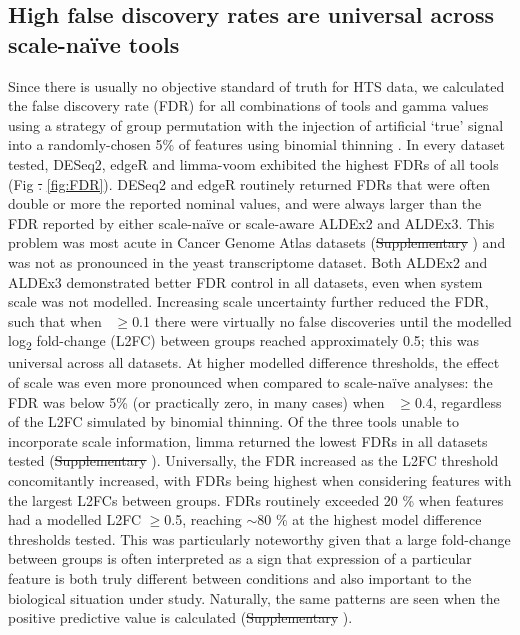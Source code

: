 \documentclass[10pt,letterpaper]{article}
\providecommand{\DIFdeltex}[1]{{\protect\color{red}\sout{#1}}}                      %
\providecommand{\DIFdelbegin}{} %
\providecommand{\DIFdelend}{} %
\providecommand{\DIFdel}[1]{\texorpdfstring{\DIFdeltex{#1}}{}} %
\newcommand{\DIFscaledelfig}{0.5}
\newlength{\DIFdelgraphicswidth} %
\newlength{\DIFdelgraphicsheight} %
\newcommand{\DIFdelincludegraphics}[2][]{%
\sbox{\DIFdelgraphicsbox}{\DIFOincludegraphics[#1]{#2}}%
\settoboxwidth{\DIFdelgraphicswidth}{\DIFdelgraphicsbox} %
\settoboxtotalheight{\DIFdelgraphicsheight}{\DIFdelgraphicsbox} %
\scalebox{\DIFscaledelfig}{%
\parbox[b]{\DIFdelgraphicswidth}{\usebox{\DIFdelgraphicsbox}\\[-\baselineskip] \rule{\DIFdelgraphicswidth}{0em}}\llap{\resizebox{\DIFdelgraphicswidth}{\DIFdelgraphicsheight}{%
\setlength{\unitlength}{\DIFdelgraphicswidth}%
\begin{picture}(1,1)%
\thicklines\linethickness{2pt} %
{\color[rgb]{1,0,0}\put(0,0){\framebox(1,1){}}}%
{\color[rgb]{1,0,0}\put(0,0){\line( 1,1){1}}}%
{\color[rgb]{1,0,0}\put(0,1){\line(1,-1){1}}}%
\end{picture}%
}\hspace*{3pt}}} %
} %
\DeclareRobustCommand{\DIFdelbegin}{\DIFOdelbegin \let\includegraphics\DIFdelincludegraphics} %
\DeclareRobustCommand{\DIFdelend}{\DIFOaddend \let\includegraphics\DIFOincludegraphics} %
\begin{document}
\subsection*{High false discovery rates are universal across scale-na\"ive tools}
Since there is usually no objective standard of truth for HTS data, we calculated the false discovery rate (FDR) for all combinations of tools and gamma values using a strategy of group permutation with the injection of artificial `true' signal into a randomly-chosen 5\% of features using binomial thinning \cite{gerard_data-based_2020}. In every dataset tested, DESeq2, edgeR and limma-voom exhibited the highest FDRs of all tools (Fig \DIFdelbegin \DIFdel{. }\DIFdelend \ref{fig:FDR}). DESeq2 and edgeR routinely returned FDRs that were often double or more the reported nominal values, and were always larger than the FDR reported by either scale-na\"ive or scale-aware ALDEx2 and ALDEx3. This problem was most acute in Cancer Genome Atlas datasets (\DIFdelbegin \DIFdel{Supplementary }\DIFdelend {}) and was not as pronounced in the yeast transcriptome dataset. Both ALDEx2 and ALDEx3 demonstrated better FDR control in all datasets, even when system scale was not modelled. Increasing scale uncertainty further reduced the FDR, such that when \textgamma~$\geq$0.1 there were virtually no false discoveries until the modelled log\textsubscript{2} fold-change (L2FC) between groups reached approximately 0.5; this was universal across all datasets. At higher modelled difference thresholds, the effect of scale was even more pronounced when compared to scale-na\"ive analyses: the FDR was below 5\% (or practically zero, in many cases) when \textgamma~$\geq$0.4, regardless of the L2FC simulated by binomial thinning. Of the three tools unable to incorporate scale information, limma returned the lowest FDRs in all datasets tested (\DIFdelbegin \DIFdel{Supplementary }\DIFdelend {}). Universally, the FDR increased as the L2FC threshold concomitantly increased, with FDRs being highest when considering features with the largest L2FCs between groups. FDRs routinely exceeded 20 \% when features had a modelled L2FC $\geq$0.5, reaching $\sim$80 \% at the highest model difference thresholds tested. This was particularly noteworthy given that a large fold-change between groups is often interpreted as a sign that expression of a particular feature is both truly different between conditions and also important to the biological situation under study. Naturally, the same patterns are seen when the positive predictive value is calculated (\DIFdelbegin \DIFdel{Supplementary }\DIFdelend {}).
\end{document}
